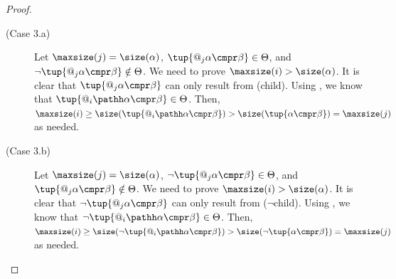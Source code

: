 \begin{proof}
\begin{description}
  
    \item[(Case 3.a)]
      Let $\maxsize(j) = \size(\alpha)$, $\tup{@_j\alpha \cmpr \beta} \in \Theta$, and $\lnot\tup{@_j\alpha \cmpr \beta} \notin \Theta$.
      We need to prove $\maxsize(i) > \size(\alpha)$.
      It is clear that $\tup{@_j\alpha \cmpr \beta}$ can only result from (child).
      Using , we know that $\tup{@_i\pathh\alpha \cmpr \beta} \in \Theta$.
      Then, $\maxsize(i) \geq \size(\tup{@_i\pathh\alpha \cmpr \beta}) > \size (\tup{\alpha \cmpr \beta}) = \maxsize(j)$ as needed.
    
    \item[(Case 3.b)]
      Let $\maxsize(j) = \size(\alpha)$, $\lnot\tup{@_j\alpha \cmpr \beta} \in \Theta$, and $\tup{@_j\alpha \cmpr \beta} \notin \Theta$.
      We need to prove $\maxsize(i) > \size(\alpha)$.
      It is clear that $\lnot\tup{@_j\alpha \cmpr \beta}$ can only result from ($\lnot$child).
      Using , we know that $\lnot\tup{@_i\pathh\alpha \cmpr \beta} \in \Theta$.
      Then, $\maxsize(i) \geq \size({\lnot\tup{@_i\pathh\alpha \cmpr \beta}}) > \size (\lnot\tup{\alpha \cmpr \beta}) = \maxsize(j)$ as needed. \qedhere



\end{description}
\end{proof}
